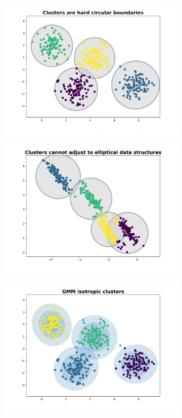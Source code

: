 \documentclass[11pt]{article}
\theoremstyle{definition}
\begin{document}
\begin{figure}[H]
	\begin{subfigure}[t]{0.49\linewidth}
		\includegraphics[width=\linewidth]{img/GMM01}
	\end{subfigure}
	\hfill
	\begin{subfigure}[t]{0.49\linewidth}
		\includegraphics[width=\linewidth]{img/GMM02}
	\end{subfigure}
	\begin{subfigure}[t]{0.49\linewidth}
		\includegraphics[width=\linewidth]{img/GMM03}

\end{subfigure}
\end{figure}
\end{document}
